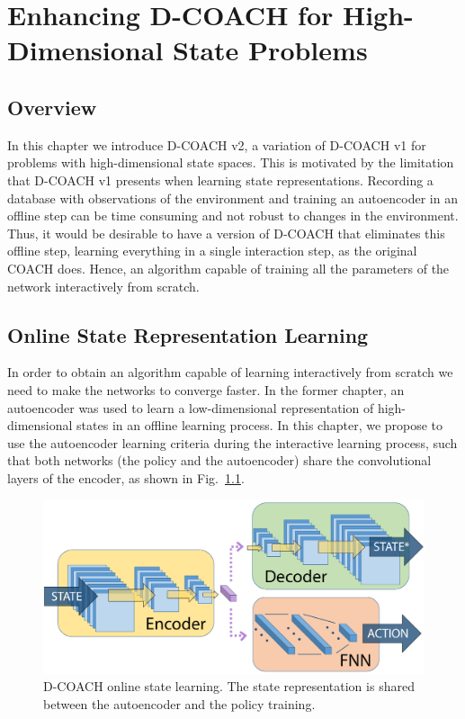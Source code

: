 \chapter{Enhancing D-COACH for High-Dimensional State Problems}
\section{Overview}

In this chapter we introduce  D-COACH v2, a variation of D-COACH v1 for problems with high-dimensional state spaces. This is motivated by the limitation that D-COACH v1 presents when learning state representations. Recording a database with observations of the environment and training an autoencoder in an offline step can be time consuming and not robust to changes in the environment. Thus, it would be desirable to have a version of D-COACH that eliminates this offline step, learning everything in a single interaction step, as the original COACH does. Hence, an algorithm capable of training all the parameters of the network interactively from scratch. 

\section{Online State Representation Learning}
In order to obtain an algorithm capable of learning interactively from scratch we need to make the networks to converge faster. In the former chapter, an autoencoder was used to learn a low-dimensional representation of high-dimensional states in an offline learning process. In this chapter, we propose to use the autoencoder learning criteria during the interactive learning process, such that both networks (the policy and the autoencoder) share the convolutional layers of the encoder, as shown in Fig.~\ref{fig:msim}.

\begin{figure}[H]
    \centering
    \includegraphics[width=0.6\linewidth]{imagenes/cap2/m2.pdf}
    \caption{D-COACH online state learning. The state representation is shared between the autoencoder and the policy training.}
    \label{fig:msim}
\end{figure}

